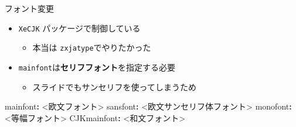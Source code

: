 \documentclass[
  12pt,
  ignorenonframetext,
]{beamer}
\newenvironment{Shaded}{\begin{snugshade}}{\end{snugshade}}
\newcommand{\AttributeTok}[1]{\textcolor[rgb]{0.77,0.63,0.00}{#1}}
\newcommand{\CharTok}[1]{\textcolor[rgb]{0.31,0.60,0.02}{#1}}
\newcommand{\FunctionTok}[1]{\textcolor[rgb]{0.00,0.00,0.00}{#1}}
\newcommand{\KeywordTok}[1]{\textcolor[rgb]{0.13,0.29,0.53}{\textbf{#1}}}
\providecommand{\tightlist}{%
  \setlength{\itemsep}{0pt}\setlength{\parskip}{0pt}}
\begin{document}
\begin{frame}[fragile]{フォント変更}
\protect\hypertarget{ux30d5ux30a9ux30f3ux30c8ux5909ux66f4}{}

\begin{itemize}
\tightlist
\item
  \texttt{XeCJK} パッケージで制御している

  \begin{itemize}
  \tightlist
  \item
    本当は \texttt{zxjatype}でやりたかった
  \end{itemize}
\item
  \texttt{mainfont}は\textbf{セリフフォント}を指定する必要

  \begin{itemize}
  \tightlist
  \item
    スライドでもサンセリフを使ってしまうため
  \end{itemize}
\end{itemize}

\begin{Shaded}
\begin{Highlighting}[]
\FunctionTok{mainfont}\KeywordTok{: }\AttributeTok{<欧文フォント}\CharTok{>}
\FunctionTok{sansfont}\KeywordTok{: }\AttributeTok{<欧文サンセリフ体フォント}\CharTok{>}
\FunctionTok{monofont}\KeywordTok{: }\AttributeTok{<等幅フォント}\CharTok{>}
\FunctionTok{CJKmainfont}\KeywordTok{: }\AttributeTok{<和文フォント}\CharTok{>}
\end{Highlighting}
\end{Shaded}

\end{frame}
\end{document}
